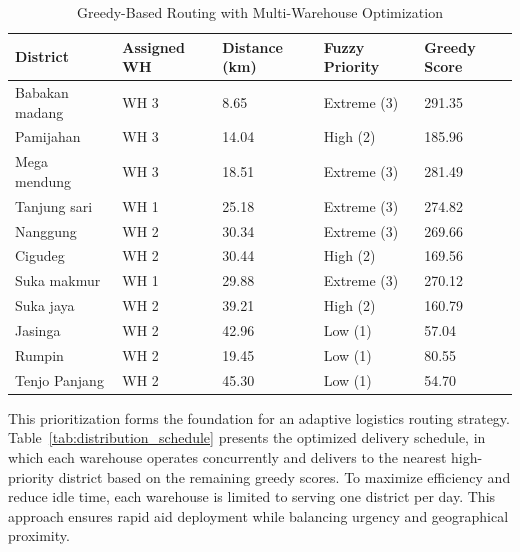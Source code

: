 \documentclass[journal,final,a4paper,twoside,11pt]{IEEEtran}
\begin{document}
\begin{table}[H]
\caption{Greedy-Based Routing with Multi-Warehouse Optimization}
\begin{center}
\begin{tabular}{|p{1.5cm}|p{1cm}|p{1cm}|p{1cm}|p{1cm}|}
\hline
\textbf{District} & \textbf{Assigned WH} & \textbf{Distance (km)} & \textbf{Fuzzy Priority} & \textbf{Greedy Score} \\
\hline
Babakan madang & WH 3 & 8.65 & Extreme (3) & 291.35 \\
\hline Pamijahan & WH 3 & 14.04 & High (2) & 185.96 \\
\hline Mega mendung & WH 3 & 18.51 & Extreme (3) & 281.49 \\
\hline  Tanjung sari & WH 1 & 25.18 & Extreme (3) & 274.82 \\
\hline Nanggung & WH 2 & 30.34 & Extreme (3) & 269.66 \\
\hline Cigudeg & WH 2 & 30.44 & High (2) & 169.56 \\
\hline Suka makmur & WH 1 & 29.88 & Extreme (3) & 270.12 \\
\hline Suka jaya & WH 2 & 39.21 & High (2) & 160.79 \\
\hline Jasinga & WH 2 & 42.96 & Low (1) & 57.04 \\
\hline Rumpin & WH 2 & 19.45 & Low (1) & 80.55 \\
\hline Tenjo Panjang & WH 2 & 45.30 & Low (1) & 54.70 \\
\hline
\end{tabular}
\label{tab:greedy_multiwh}
\end{center}
\end{table}

This prioritization forms the foundation for an adaptive logistics routing strategy. Table~\ref{tab:distribution_schedule} presents the optimized delivery schedule, in which each warehouse operates concurrently and delivers to the nearest high-priority district based on the remaining greedy scores. To maximize efficiency and reduce idle time, each warehouse is limited to serving one district per day. This approach ensures rapid aid deployment while balancing urgency and geographical proximity.
\end{document}
